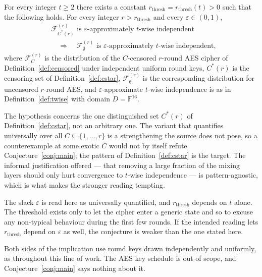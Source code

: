 \documentclass{aicr-conjecture}
\newcommand{\FF}{\mathbb{F}}
\newcommand{\rth}{r_{\mathrm{thresh}}}
\newcommand{\Fd}{\mathcal{F}}
\begin{document}
\begin{conjecture}\label{conj:main}
For every integer $t \ge 2$ there exists a constant
$\rth = \rth(t) > 0$ such that the following holds. For every integer
$r > \rth$ and every $\varepsilon \in (0,1)$,
\begin{align*}
  &\Fd^{(r)}_{C^{*}(r)}
   \text{ is } \varepsilon\text{-approximately } t\text{-wise
   independent}\\
  &\quad\Longrightarrow\quad
   \Fd^{(r)}_{\emptyset}
   \text{ is } \varepsilon\text{-approximately } t\text{-wise
   independent},
\end{align*}
where $\Fd^{(r)}_{C}$ is the distribution of the $C$-censored $r$-round
AES cipher of Definition~\ref{def:censored} under independent uniform round
keys, $C^{*}(r)$ is the censoring set of Definition~\ref{def:cstar},
$\Fd^{(r)}_{\emptyset}$ is the corresponding distribution for uncensored
$r$-round AES, and $\varepsilon$-approximate $t$-wise independence is as in
Definition~\ref{def:twise} with domain $D = \FF^{16}$.
\end{conjecture}

\begin{remark}\label{rem:pattern}
The hypothesis concerns the one distinguished set $C^{*}(r)$ of
Definition~\ref{def:cstar}, not an arbitrary one. The variant that
quantifies universally over all $C \subseteq \{1,\dots,r\}$ is a
strengthening the source does not pose, so a counterexample at some exotic
$C$ would not by itself refute Conjecture~\ref{conj:main}; the pattern of
Definition~\ref{def:cstar} is the target. The informal justification
offered --- that removing a large fraction of the mixing layers should only
hurt convergence to $t$-wise independence --- is pattern-agnostic, which is
what makes the stronger reading tempting.
\end{remark}

\begin{remark}\label{rem:quant}
The slack $\varepsilon$ is read here as universally quantified, and
$\rth$ depends on $t$ alone. The threshold exists only to let the cipher
enter a generic state and so to excuse any non-typical behaviour during the
first few rounds. If the intended reading lets $\rth$ depend on
$\varepsilon$ as well, the conjecture is weaker than the one stated here.
\end{remark}

\begin{remark}\label{rem:keys}
Both sides of the implication use round keys drawn independently and
uniformly, as throughout this line of work. The AES key schedule is out of
scope, and Conjecture~\ref{conj:main} says nothing about it.
\end{remark}
\end{document}
